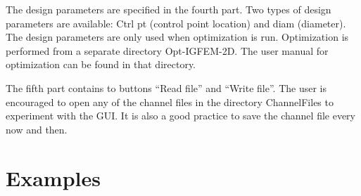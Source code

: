 \documentclass[11pt,letterpaper]{article}
\begin{document}
The design parameters are specified in the fourth part. Two types of design parameters are available: Ctrl pt (control point location) and diam (diameter). The design parameters are only used when optimization is run. Optimization is performed from a separate directory Opt-IGFEM-2D. The user manual for optimization can be found in that directory. 

The fifth part contains to buttons ``Read file'' and ``Write file''. The user is encouraged to open any of the channel files in the directory ChannelFiles to experiment with the GUI. It is also a good practice to save the channel file every now and then.
 
\FloatBarrier
\section{Examples}
\end{document}
